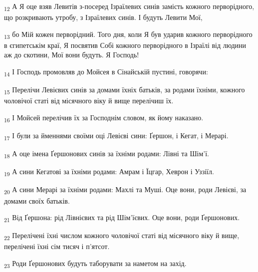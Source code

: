 \begin{tcolorbox}
\textsubscript{12} А Я оце взяв Левитів з-посеред Ізраїлевих синів замість кожного перворідного, що розкривають утробу, з Ізраїлевих синів. І будуть Левити Мої,
\end{tcolorbox}
\begin{tcolorbox}
\textsubscript{13} бо Мій кожен перворідний. Того дня, коли Я був ударив кожного перворідного в єгипетськім краї, Я посвятив Собі кожного перворідного в Ізраїлі від людини аж до скотини, Мої вони будуть. Я Господь!
\end{tcolorbox}
\begin{tcolorbox}
\textsubscript{14} І Господь промовляв до Мойсея в Сінайській пустині, говорячи:
\end{tcolorbox}
\begin{tcolorbox}
\textsubscript{15} Перелічи Левієвих синів за домами їхніх батьків, за родами їхніми, кожного чоловічої статі від місячного віку й вище перелічиш їх.
\end{tcolorbox}
\begin{tcolorbox}
\textsubscript{16} І Мойсей перелічив їх за Господнім словом, як йому наказано.
\end{tcolorbox}
\begin{tcolorbox}
\textsubscript{17} І були за йменнями своїми оці Левієві сини: Ґершон, і Кегат, і Мерарі.
\end{tcolorbox}
\begin{tcolorbox}
\textsubscript{18} А оце імена Ґершонових синів за їхніми родами: Лівні та Шім'ї.
\end{tcolorbox}
\begin{tcolorbox}
\textsubscript{19} А сини Кегатові за їхніми родами: Амрам і Їцгар, Хеврон і Уззіїл.
\end{tcolorbox}
\begin{tcolorbox}
\textsubscript{20} А сини Мерарі за їхніми родами: Махлі та Муші. Оце вони, роди Левієві, за домами своїх батьків.
\end{tcolorbox}
\begin{tcolorbox}
\textsubscript{21} Від Ґершона: рід Лівнієвих та рід Шім'їєвих. Оце вони, роди Ґершонових.
\end{tcolorbox}
\begin{tcolorbox}
\textsubscript{22} Перелічені їхні числом кожного чоловічої статі від місячного віку й вище, перелічені їхні сім тисяч і п'ятсот.
\end{tcolorbox}
\begin{tcolorbox}
\textsubscript{23} Роди Ґершонових будуть таборувати за наметом на захід.
\end{tcolorbox}
